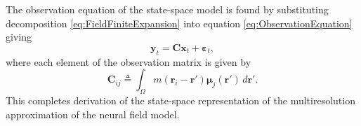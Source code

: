 \documentclass[journal,a4paper]{IEEEtran}
\newcommand{\parham}[1]{\textsf{\emph{\textbf{\textcolor{blue}{#1}}}}}
\begin{document}
The observation equation of the state-space model is found by substituting decomposition \eqref{eq:FieldFiniteExpansion}
 into equation \eqref{eq:ObservationEquation} giving
\begin{equation}\label{eq:ReducedObservationEquation} 
	\mathbf{y}_t = \mathbf{C}\mathbf{x}_t + \boldsymbol{\varepsilon}_t,
\end{equation}
where each element of the observation matrix is given by
\begin{equation}
	\mathbf{C}_{ij} \triangleq \int_{\Omega}m(\mathbf{r}_i - \mathbf{r}')\boldsymbol{\mu}_j(\mathbf{r}') \, d\mathbf{r}'.
\end{equation}
This completes derivation of the state-space representation of the multiresolution approximation of the neural field model. 
\end{document}
